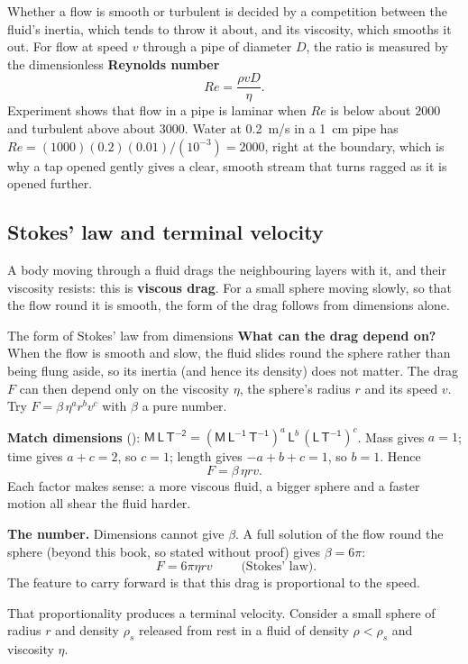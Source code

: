 Whether a flow is smooth or turbulent is decided by a competition between the fluid's inertia, which tends
to throw it about, and its viscosity, which smooths it out. For flow at speed $v$ through a pipe of
diameter $D$, the ratio is measured by the dimensionless \textbf{Reynolds number}
\[
Re=\frac{\rho vD}{\eta}.
\]
Experiment shows that flow in a pipe is laminar when $Re$ is below about $2000$ and turbulent above about
$3000$. Water at \SI{0.2}{m/s} in a \SI{1}{cm} pipe has $Re=(1000)(0.2)(0.01)/(10^{-3})=2000$, right at the
boundary, which is why a tap opened gently gives a clear, smooth stream that turns ragged as it is opened
further.

\subsection{Stokes' law and terminal velocity}

A body moving through a fluid drags the neighbouring layers with it, and their viscosity resists: this is
\textbf{viscous drag}. For a small sphere moving slowly, so that the flow round it is smooth, the form of the
drag follows from dimensions alone.

\begin{derivbox}{The form of Stokes' law from dimensions}
 \textbf{What can the drag depend on?} When the flow is smooth and slow, the fluid slides round the
sphere rather than being flung aside, so its inertia (and hence its density) does not matter. The drag $F$
can then depend only on the viscosity $\eta$, the sphere's radius $r$ and its speed $v$. Try
$F=\beta\,\eta^a r^b v^c$ with $\beta$ a pure number.

 \textbf{Match dimensions} ():
$\mathsf{M\,L\,T^{-2}}=(\mathsf{M\,L^{-1}\,T^{-1}})^a\,\mathsf{L}^b\,(\mathsf{L\,T^{-1}})^c$. Mass gives
$a=1$; time gives $a+c=2$, so $c=1$; length gives $-a+b+c=1$, so $b=1$. Hence
\[
F=\beta\,\eta rv.
\]
Each factor makes sense: a more viscous fluid, a bigger sphere and a faster motion all shear the fluid
harder.

 \textbf{The number.} Dimensions cannot give $\beta$. A full solution of the flow round the sphere
(beyond this book, so stated without proof) gives $\beta=6\pi$:
\[
\boxed{\;F=6\pi\eta rv\;}\qquad\text{(Stokes' law).}
\]
The feature to carry forward is that this drag is proportional to the speed.
\end{derivbox}

That proportionality produces a terminal velocity. Consider a small sphere of radius $r$ and density
$\rho_s$ released from rest in a fluid of density $\rho<\rho_s$ and viscosity $\eta$.


